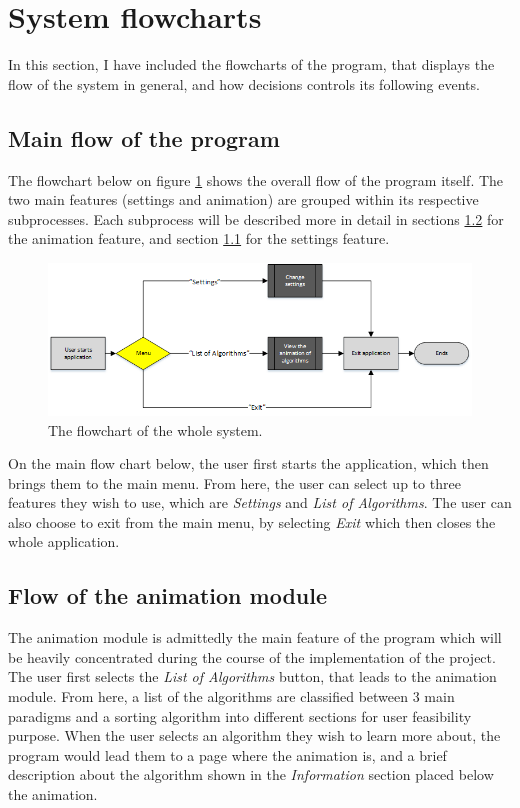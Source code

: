 \section{System flowcharts}
In this section, I have included the flowcharts of the program, that displays the flow of the system in general, and how decisions controls its following events. 

\subsection{Main flow of the program}
The flowchart below on figure \ref{mainFlowChart} shows the overall flow of the program itself. The two main features (settings and animation) are grouped within its respective subprocesses. Each subprocess will be described more in detail in sections \ref{sec:flowchartAnimation} for the animation feature, and section \ref{} for the settings feature.

\begin{figure}[H]
\centering
\hspace*{-1cm}
\includegraphics[scale=1]{images/report_images/flowchartMain.png}
\caption{The flowchart of the whole system.}
\label{mainFlowChart}
\end{figure}

On the main flow chart below, the user first starts the application, which then brings them to the main menu. From here, the user can select up to three features they wish to use, which are \textit{Settings} and \textit{List of Algorithms}. The user can also choose to exit from the main menu, by selecting \textit{Exit} which then closes the whole application.

\subsection{Flow of the animation module} \label{sec:flowchartAnimation}
The animation module is admittedly the main feature of the program which will be heavily concentrated during the course of the implementation of the project. The user first selects the \textit{List of Algorithms} button, that leads to the animation module. From here, a list of the algorithms are classified between 3 main paradigms and a sorting algorithm into different sections for user feasibility purpose. When the user selects an algorithm they wish to learn more about, the program would lead them to a page where the animation is, and a brief description about the algorithm shown in the \textit{Information} section placed below the animation. 

